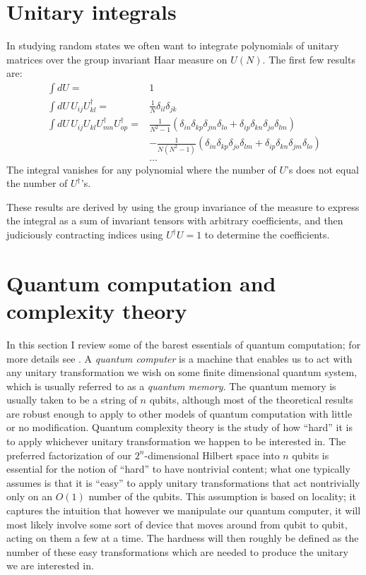 \documentclass[12pt]{article}
\begin{document}
\section{Unitary integrals}\label{Uintsec}
In studying random states we often want to integrate polynomials of unitary matrices over the group invariant Haar measure on $U(N)$.  The first few results are:
\begin{align}\nonumber
\int dU=&1\\\nonumber
\int dU \,U_{ij} U^\dagger_{kl}=&\frac{1}{N}\delta_{il}\delta_{jk}\\\nonumber
\int dU\, U_{ij}U_{kl}U^\dagger_{mn}U^\dagger_{op}=&\frac{1}{N^2-1}\left(\delta_{in}\delta_{kp}\delta_{jm}\delta_{lo}+\delta_{ip}\delta_{kn}\delta_{jo}\delta_{lm}\right)\\\nonumber
&-\frac{1}{N(N^2-1)}\left(\delta_{in}\delta_{kp}\delta_{jo}\delta_{lm}+\delta_{ip}\delta_{kn}\delta_{jm}\delta_{lo}\right)\\
&\ldots\label{Uints}
\end{align}
The integral vanishes for any polynomial where the number of $U$'s does not equal the number of $U^\dagger$'s.

These results are derived by using the group invariance of the measure to express the integral as a sum of invariant tensors with arbitrary coefficients, and then judiciously contracting indices using $U^\dagger U=1$ to determine the coefficients.  

\section{Quantum computation and complexity theory}\label{compsec}
In this section I review some of the barest essentials of quantum computation; for more details see  \cite{nielsen2010quantum,preskillnotes}.  A \textit{quantum computer} is a machine that enables us to act with any unitary transformation we wish on some finite dimensional quantum system, which is usually referred to as a \textit{quantum memory}. The quantum memory is usually taken to be a string of $n$ qubits, although most of the theoretical results are robust enough to apply to other models of quantum computation with little or no modification.  Quantum complexity theory is the study of how ``hard'' it is to apply whichever unitary transformation we happen to be interested in.  The preferred factorization of our $2^n$-dimensional Hilbert space into $n$ qubits is essential for the notion of ``hard'' to have nontrivial content; what one typically assumes is that it is ``easy'' to apply unitary transformations that act nontrivially only on an $O(1)$ number of the qubits.  This assumption is based on locality; it captures the intuition that however we manipulate our quantum computer, it will most likely involve some sort of device that moves around from qubit to qubit, acting on them a few at a time.  The hardness will then roughly be defined as the number of these easy transformations which are needed to produce the unitary we are interested in.
\end{document}
